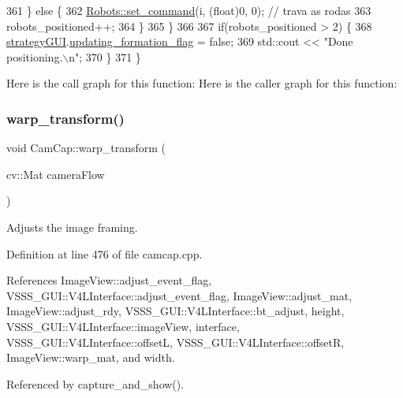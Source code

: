 \begin{DoxyCode}
361         \} \textcolor{keywordflow}{else} \{
362             \hyperlink{class_robots_ae5034abea0160aac1d77ad154ee77f64}{Robots::set\_command}(i, (\textcolor{keywordtype}{float})0, 0); \textcolor{comment}{// trava as rodas}
363             robots\_positioned++;
364         \}
365     \}
366 
367     \textcolor{keywordflow}{if}(robots\_positioned > 2) \{
368         \hyperlink{class_cam_cap_a71ae899fee6c1b02de3c373965208e52}{strategyGUI}.\hyperlink{class_strategy_g_u_i_a46f3c766dd61236382cc2681372f6538}{updating\_formation\_flag} = \textcolor{keyword}{false};
369         std::cout << \textcolor{stringliteral}{"Done positioning.\(\backslash\)n"};
370     \}
371 \}
\end{DoxyCode}
Here is the call graph for this function\+:
Here is the caller graph for this function\+:
\mbox{\label{class_cam_cap_a90c0560e51d69bc551ae17c72edb3028}} 
\subsubsection{\texorpdfstring{warp\+\_\+transform()}{warp\_transform()}}
{\footnotesize\ttfamily void Cam\+Cap\+::warp\+\_\+transform (\begin{DoxyParamCaption}\item[{cv\+::\+Mat}]{camera\+Flow }\end{DoxyParamCaption})}



Adjusts the image framing. 



Definition at line 476 of file camcap.\+cpp.



References Image\+View\+::adjust\+\_\+event\+\_\+flag, V\+S\+S\+S\+\_\+\+G\+U\+I\+::\+V4\+L\+Interface\+::adjust\+\_\+event\+\_\+flag, Image\+View\+::adjust\+\_\+mat, Image\+View\+::adjust\+\_\+rdy, V\+S\+S\+S\+\_\+\+G\+U\+I\+::\+V4\+L\+Interface\+::bt\+\_\+adjust, height, V\+S\+S\+S\+\_\+\+G\+U\+I\+::\+V4\+L\+Interface\+::image\+View, interface, V\+S\+S\+S\+\_\+\+G\+U\+I\+::\+V4\+L\+Interface\+::offsetL, V\+S\+S\+S\+\_\+\+G\+U\+I\+::\+V4\+L\+Interface\+::offsetR, Image\+View\+::warp\+\_\+mat, and width.



Referenced by capture\+\_\+and\+\_\+show().


